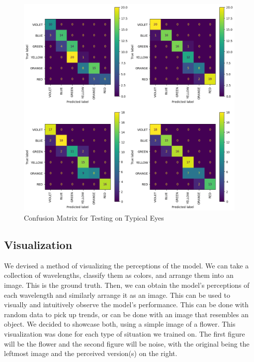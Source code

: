 \documentclass[titlepage]{article}
\begin{document}
\begin{figure}[H]
    \centering
    \includegraphics[width=\textwidth]{figs/tetrachromatic_confusion_matrix.png}
    \caption{Confusion Matrix for Testing on Typical Eyes}
    \label{fig:tetrachromatic_confusion_matrix}
\end{figure}

\subsection{Visualization}

We devised a method of visualizing the perceptions of the model. We can take a collection of wavelengths, classify them as colors, and arrange them into an image. This is the ground truth. Then, we can obtain the model's perceptions of each wavelength and similarly arrange it as an image. This can be used to visually and intuitively observe the model's performance. This can be done with random data to pick up trends, or can be done with an image that resembles an object. We decided to showcase both, using a simple image of a flower. This visualization was done for each type of situation we trained on. The first figure will be the flower and the second figure will be noise, with the original being the leftmost image and the perceived version(s) on the right.

\bigskip
\end{document}
